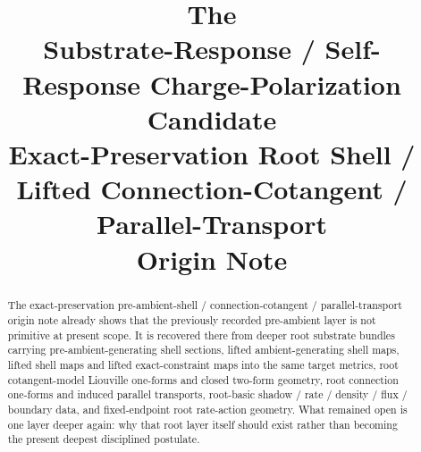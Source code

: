 \documentclass[11pt]{article}
\title{\textbf{The \TheoryName{}}\\[0.4em]
\large Substrate-Response / Self-Response Charge-Polarization Candidate\\
\large Exact-Preservation Root Shell / Lifted Connection-Cotangent / Parallel-Transport\\
\large Origin Note}
\author{}
\date{}
\begin{document}
\maketitle

\begin{abstract}
The exact-preservation pre-ambient-shell / connection-cotangent / parallel-transport origin note already shows that the previously recorded pre-ambient layer is not primitive at present scope. It is recovered there from deeper root substrate bundles carrying pre-ambient-generating shell sections, lifted ambient-generating shell maps, lifted shell maps and lifted exact-constraint maps into the same target metrics, root cotangent-model Liouville one-forms and closed two-form geometry, root connection one-forms and induced parallel transports, root-basic shadow / rate / density / flux / boundary data, and fixed-endpoint root rate-action geometry. What remained open is one layer deeper again: why that root layer itself should exist rather than becoming the present deepest disciplined postulate.


\end{abstract}
\end{document}
